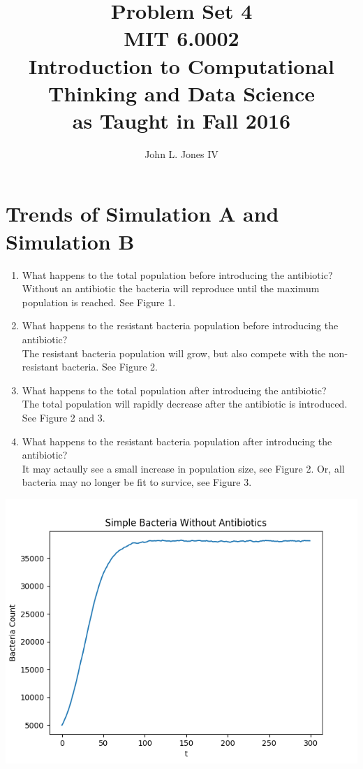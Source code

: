 \documentclass[letterpaper,11pt]{article}
\begin{document}
\title{
	\Huge{Problem Set 4}\\
	\Large{MIT 6.0002}\\
	\large{Introduction to Computational Thinking and Data Science\\
	as Taught in Fall 2016}
}
\author{
	John L. Jones IV
}
\maketitle
\pagebreak
\section*{Trends of Simulation A and Simulation B}
\begin{enumerate}
	\item What happens to the total population before introducing the antibiotic?
		\\ Without an antibiotic the bacteria will reproduce until the maximum population is reached. See Figure 1. 
	\item What happens to the resistant bacteria population before introducing the antibiotic?
		\\ The resistant bacteria population will grow, but also compete with the non-resistant bacteria. See Figure 2. 
	\item What happens to the total population after introducing the antibiotic?
		\\ The total population will rapidly decrease after the antibiotic is introduced. See Figure 2 and 3.
	\item What happens to the resistant bacteria population after introducing the antibiotic?
		\\ It may actaully see a small increase in population size, see Figure 2.
		Or, all bacteria may no longer be fit to survice, see Figure 3.
\end{enumerate}

\includegraphics{Figure_1}
\end{document}
